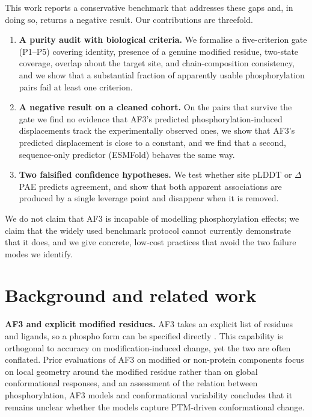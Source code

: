 This work reports a conservative benchmark that addresses these gaps and,
in doing so, returns a negative result. Our contributions are threefold.

\begin{enumerate}
\item \textbf{A purity audit with biological criteria.} We formalise a
five-criterion gate (P1--P5) covering identity, presence of a genuine
modified residue, two-state coverage, overlap about the target site, and
chain-composition consistency, and we show that a substantial fraction of
apparently usable phosphorylation pairs fail at least one criterion.
\item \textbf{A negative result on a cleaned cohort.} On the pairs that
survive the gate we find no evidence that AF3's predicted
phosphorylation-induced displacements track the experimentally observed
ones, we show that AF3's predicted displacement is close to a constant,
and we find that a second, sequence-only predictor (ESMFold) behaves the
same way.
\item \textbf{Two falsified confidence hypotheses.} We test whether site
pLDDT or $\Delta$PAE predicts agreement, and show that both apparent
associations are produced by a single leverage point and disappear when it
is removed.
\end{enumerate}

We do not claim that AF3 is incapable of modelling phosphorylation
effects; we claim that the widely used benchmark protocol cannot
currently demonstrate that it does, and we give concrete,
low-cost practices that avoid the two failure modes we identify.

\section{Background and related work}
\label{sec:background}

\noindent\textbf{AF3 and explicit modified residues.} AF3 takes an
explicit list of residues and ligands, so a phospho form can be specified
directly \citep{abramson2024alphafold3}. This capability is orthogonal to accuracy on
modification-induced change, yet the two are often conflated. Prior
evaluations of AF3 on modified or non-protein components
\citep{nam2026alphafold3} focus on local geometry around the modified
residue rather than on global conformational responses, and an assessment
of the relation between phosphorylation, AF3 models and conformational
variability \citep{ramasamy2026phosphoaf3} concludes that it remains
unclear whether the models capture PTM-driven conformational change.

